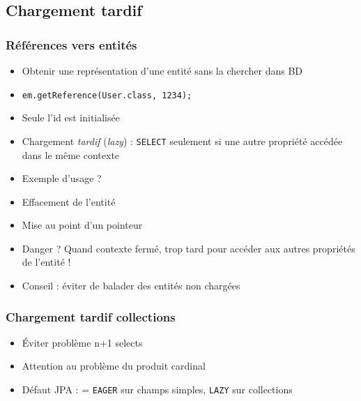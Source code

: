 \documentclass[french, english]{beamer}
\begin{document}
\subsection{Chargement tardif}
\begin{frame}
	\frametitle{Références vers entités}
	\begin{itemize}
		\item Obtenir une représentation d’une entité sans la chercher dans BD
		\item \texttt{em.getReference(User.class, 1234);}
		\item Seule l’id est initialisée
		\item Chargement \emph{tardif} (\emph{lazy}) : \texttt{SELECT} seulement si une autre propriété accédée {\tiny dans le même contexte}
		\item Exemple d’usage ? \pause
		\item Effacement de l’entité
		\item Mise au point d’un pointeur \pause
		\item Danger ? \pause Quand contexte fermé, trop tard pour accéder aux autres propriétés de l’entité !
		\item Conseil : éviter de balader des entités non chargées
	\end{itemize}
\end{frame}

\begin{frame}
	\frametitle{Chargement tardif collections}
	\begin{itemize}
		\item Éviter problème n+1 selects %
		\item Attention au problème du produit cardinal
		\item Défaut JPA :  = \texttt{EAGER} sur champs simples, \texttt{LAZY} sur collections
	\end{itemize}
\end{frame}
\end{document}
